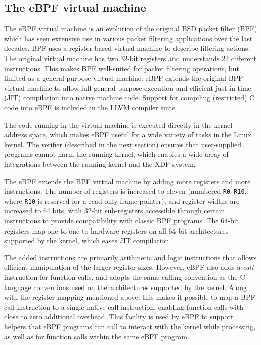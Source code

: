\documentclass[10pt,sigconf]{acmart}
\begin{document}
\subsection{The eBPF virtual machine}
\label{sec:bpf-vm}
The eBPF virtual machine is an evolution of the original BSD packet filter (BPF)
\cite{mccanne_bsd_1993} which has seen extensive use in various packet filtering
applications over the last decades. BPF uses a register-based virtual machine to
describe filtering actions. The original virtual machine has two 32-bit registers and
understands 22 different instructions. This makes BPF well-suited for packet
filtering operations, but limited as a general purpose virtual machine. eBPF
extends the original BPF virtual machine to allow full general purpose execution
and efficient just-in-time (JIT) compilation into native machine code. Support
for compiling (restricted) C code into eBPF is included in the LLVM compiler
suite

The code running in the virtual machine is executed directly in the kernel
address space, which makes eBPF useful for a wide variety of tasks in the Linux
kernel. The verifier (described in the next section) ensures that user-supplied
programs cannot harm the running kernel, which enables a wide array of
integrations between the running kernel and the XDP system.

The eBPF extends the BPF virtual machine by adding more registers and more
instructions. The number of registers is increased to eleven (numbered
\texttt{R0}--\texttt{R10}, where \texttt{R10} is reserved for a read-only frame
pointer), and register widths are increased to 64 bits, with 32-bit
sub-registers accessible through certain instructions to provide compatibility
with classic BPF programs. The 64-bit registers map one-to-one to hardware
registers on all 64-bit architectures supported by the kernel, which eases JIT
compilation.

The added instructions are primarily arithmetic and logic instructions that
allows efficient manipulation of the larger register sizes. However, eBPF also
adds a \emph{call} instruction for function calls, and adopts the same calling
convention as the C language conventions used on the architectures supported by
the kernel. Along with the register mapping mentioned above, this makes it
possible to map a BPF call instruction to a single native call instruction,
enabling function calls with close to zero additional overhead. This facility is
used by eBPF to support helpers that eBPF programs can call to interact with the
kernel while processing, as well as for function calls within the same eBPF
program.
\end{document}
